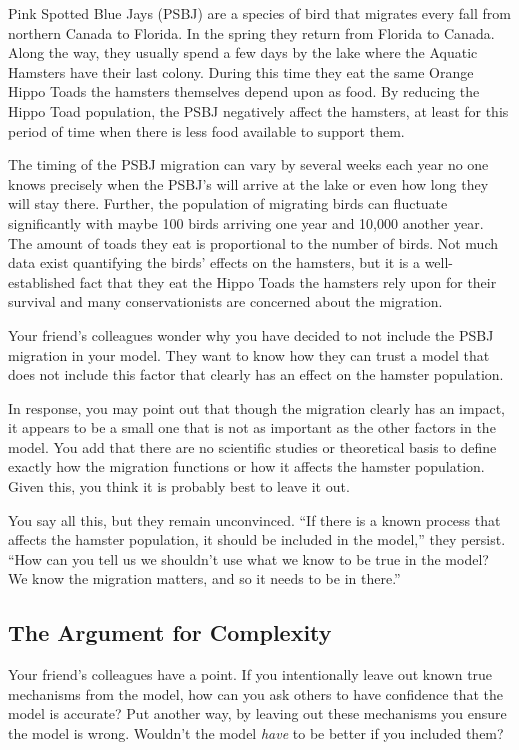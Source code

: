 \documentclass[]{memoir}
\begin{document}
Pink Spotted Blue Jays (PSBJ) are a species of bird that migrates every
fall from northern Canada to Florida. In the spring they return from
Florida to Canada. Along the way, they usually spend a few days by the
lake where the Aquatic Hamsters have their last colony. During this time
they eat the same Orange Hippo Toads the hamsters themselves depend upon
as food. By reducing the Hippo Toad population, the PSBJ negatively
affect the hamsters, at least for this period of time when there is less
food available to support them.

The timing of the PSBJ migration can vary by several weeks each year no
one knows precisely when the PSBJ's will arrive at the lake or even how
long they will stay there. Further, the population of migrating birds
can fluctuate significantly with maybe 100 birds arriving one year and
10,000 another year. The amount of toads they eat is proportional to the
number of birds. Not much data exist quantifying the birds' effects on
the hamsters, but it is a well-established fact that they eat the Hippo
Toads the hamsters rely upon for their survival and many
conservationists are concerned about the migration.

Your friend's colleagues wonder why you have decided to not include the
PSBJ migration in your model. They want to know how they can trust a
model that does not include this factor that clearly has an effect on
the hamster population.

In response, you may point out that though the migration clearly has an
impact, it appears to be a small one that is not as important as the
other factors in the model. You add that there are no scientific studies
or theoretical basis to define exactly how the migration functions or
how it affects the hamster population. Given this, you think it is
probably best to leave it out.

You say all this, but they remain unconvinced. ``If there is a known
process that affects the hamster population, it should be included in
the model,'' they persist. ``How can you tell us we shouldn't use what
we know to be true in the model? We know the migration matters, and so
it needs to be in there.''

\subsection{The Argument for Complexity}

Your friend's colleagues have a point. If you intentionally leave out
known true mechanisms from the model, how can you ask others to have
confidence that the model is accurate? Put another way, by leaving out
these mechanisms you ensure the model is wrong. Wouldn't the model
\emph{have} to be better if you included them?
\end{document}
